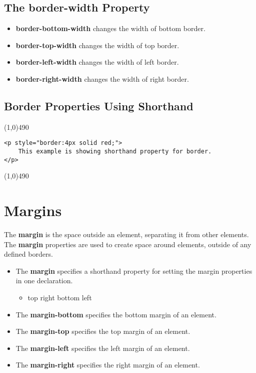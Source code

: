 \documentclass{report}
\begin{document}
    \bigbreak \noindent 
    \subsection{The \textbf{border-width} Property}
    \bigbreak \noindent 
    \begin{itemize}
        \item \textbf{border-bottom-width} changes the width of bottom border.
        \item \textbf{border-top-width} changes the width of top border.
        \item \textbf{border-left-width} changes the width of left border.
        \item \textbf{border-right-width} changes the width of right border.
    \end{itemize}
    
    \bigbreak \noindent 
    \subsection{Border Properties Using Shorthand}
    \bigbreak \noindent 
    \line(1,0){490}
    \begin{verbatim}
<p style="border:4px solid red;">
    This example is showing shorthand property for border.
</p>
    \end{verbatim}
    \line(1,0){490}

    \pagebreak \bigbreak \noindent 
    \section{\LARGE Margins}
    \bigbreak \noindent 
    The \textbf{margin} is the space outside an element, separating it from other elements. The \textbf{margin} properties are used to create space around elements, outside of any defined borders.
    \bigbreak \noindent 
    \begin{itemize}
        \item The \textbf{margin} specifies a shorthand property for setting the margin properties in one declaration.
            \begin{itemize}
                \item top right bottom left
            \end{itemize}
        \item The \textbf{margin-bottom} specifies the bottom margin of an element.
        \item The \textbf{margin-top} specifies the top margin of an element.
        \item The \textbf{margin-left} specifies the left margin of an element.
        \item The \textbf{margin-right} specifies the right margin of an element.
    \end{itemize}
\end{document}
